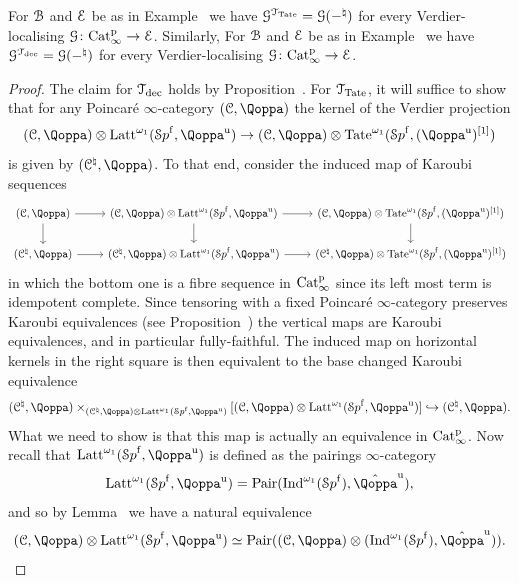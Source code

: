 \begin{lemma}
\label{lemma:T-Karoubi-examples}%
For $\mathcal{B}$ and $\mathcal{E}$ be as in Example~ we have $\mathcal{G}^{\mathcal{T}_{\operatorname{Tate}}} = \mathcal{G}(-^{\natural})$ for every Verdier-localising $\mathcal{G}\colon \mathrm{Cat}^{\mathrm p}_\infty \to \mathcal{E}$. Similarly, 
For $\mathcal{B}$ and $\mathcal{E}$ be as in Example~ we have $\mathcal{G}^{\mathcal{T}_{\mathrm{dec}}} = \mathcal{G}(-^{\natural})$ for every Verdier-localising $\mathcal{G}\colon \mathrm{Cat}^{\mathrm p}_\infty \to \mathcal{E}$.
\end{lemma}
\begin{proof}
The claim for $\mathcal{T}_{\mathrm{dec}}$ holds by Proposition~.
For $\mathcal{T}_{\operatorname{Tate}}$, it will suffice to show that for any Poincaré $\infty$-category $(\C,\QF)$ the kernel of the Verdier projection 
\[
(\C,\QF) \otimes \Latt^{\omega_1}(\Spaf, \QF^{\uni}) \to (\C,\QF) \otimes \Tate^{\omega_1}(\Spaf, (\QF^{\uni})\qshift{1})
\]
is given by $(\C^{\natural},\QF)$. To that end, consider the induced map of Karoubi sequences
\[
\begin{tikzcd}
(\C,\QF)\ar[r]\ar[d] & (\C,\QF) \otimes \Latt^{\omega_1}(\Spaf, \QF^{\uni}) \ar[r]\ar[d] & (\C,\QF) \otimes \Tate^{\omega_1}(\Spaf, (\QF^{\uni})\qshift{1})\ar[d] \\
(\C^{\natural},\QF)\ar[r] & (\C^{\natural},\QF) \otimes \Latt^{\omega_1}(\Spaf, \QF^{\uni}) \ar[r] & (\C^{\natural},\QF) \otimes \Tate^{\omega_1}(\Spaf, (\QF^{\uni})\qshift{1}) 
\end{tikzcd}
\]
in which the bottom one is a fibre sequence in $\mathrm{Cat}^{\mathrm p}_\infty$ since its left most term is idempotent complete. Since tensoring with a fixed Poincaré $\infty$-category preserves Karoubi equivalences (see Proposition~\;) 
the vertical maps are Karoubi equivalences, and in particular fully-faithful. The induced map on horizontal kernels in the right square is then equivalent to the base changed Karoubi equivalence
\[
(\C^{\natural},\QF) \times_{(\C^{\natural},\QF) \otimes \Latt^{\omega_1}(\Spaf, \QF^{\uni})}[(\C,\QF) \otimes \Latt^{\omega_1}(\Spaf, \QF^{\uni})] \hookrightarrow (\C^{\natural},\QF).
\]
What we need to show is that this map is actually an equivalence in $\mathrm{Cat}^{\mathrm p}_\infty$. Now recall that $\Latt^{\omega_1}(\Spaf,\QF^{\uni})$ is defined as the pairings $\infty$-category 
\[
\Latt^{\omega_1}(\Spaf,\QF^{\uni}) = \Pairings(\Ind^{\omega_1}(\Spaf),\hat{\QF}^{\uni}) ,
\]
and so by Lemma~ we have a natural equivalence
\[
(\C,\QF) \otimes \Latt^{\omega_1}(\Spaf,\QF^{\uni}) \simeq \Pairings((\C,\QF) \otimes (\Ind^{\omega_1}(\Spaf),\hat{\QF}^{\uni})) .
\]
\end{proof}
